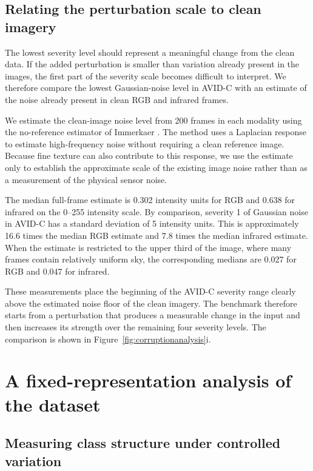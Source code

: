 \documentclass[10pt]{article}
\newcommand{\corrupt}{\textsc{AVID-C}}
\begin{document}
\subsection{Relating the perturbation scale to clean imagery}

The lowest severity level should represent a meaningful change from the clean data. If the added perturbation is smaller than variation already present in the images, the first part of the severity scale becomes difficult to interpret. We therefore compare the lowest Gaussian-noise level in \corrupt{} with an estimate of the noise already present in clean RGB and infrared frames.

We estimate the clean-image noise level from 200 frames in each modality using the no-reference estimator of Immerkaer \citep{immerkaer1996}. The method uses a Laplacian response to estimate high-frequency noise without requiring a clean reference image. Because fine texture can also contribute to this response, we use the estimate only to establish the approximate scale of the existing image noise rather than as a measurement of the physical sensor noise.

The median full-frame estimate is 0.302 intensity units for RGB and 0.638 for infrared on the 0--255 intensity scale. By comparison, severity 1 of Gaussian noise in \corrupt{} has a standard deviation of 5 intensity units. This is approximately 16.6 times the median RGB estimate and 7.8 times the median infrared estimate. When the estimate is restricted to the upper third of the image, where many frames contain relatively uniform sky, the corresponding medians are 0.027 for RGB and 0.047 for infrared.

These measurements place the beginning of the \corrupt{} severity range clearly above the estimated noise floor of the clean imagery. The benchmark therefore starts from a perturbation that produces a measurable change in the input and then increases its strength over the remaining four severity levels. The comparison is shown in Figure~\ref{fig:corruptionanalysis}i.


\section{A fixed-representation analysis of the dataset}
\label{sec:intrinsic}

\subsection{Measuring class structure under controlled variation}
\end{document}
